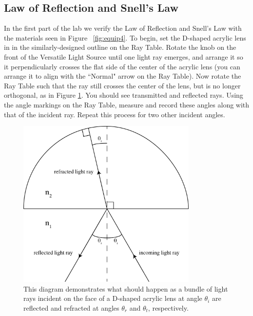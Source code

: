 \subsection{Law of Reflection and Snell's Law}
\label{sec:refsnell}
In the first part of the lab we verify the Law of Reflection and Snell's Law with the materials seen in Figure ~\ref{fig:equip4}.  To begin, set the D-shaped acrylic lens in in the similarly-designed outline on the Ray Table.  Rotate the knob on the front of the Versatile Light Source until one light ray emerges, and arrange it so it perpendicularly crosses the flat side of the center of the acrylic lens (you can arrange it to align with the ``Normal" arrow on the Ray Table).  Now rotate the Ray Table such that the ray still crosses the center of the lens, but is no longer orthogonal, as in Figure \ref{fig:slaw}.  You should see transmitted and reflected rays.  Using the angle markings on the Ray Table, measure and record these angles along with that of the incident ray.  Repeat this process for two other incident angles.\myskip

\begin{figure}[h]
\centering
\includegraphics[width=0.8\textwidth]{./Exp6/pic/snelllawdiagram.png}
\caption{This diagram demonstrates what should happen as a bundle of light rays incident on the face of a D-shaped acrylic lens at angle $\theta_{i}$ are reflected and refracted at angles $\theta_{r}$ and $\theta_{t}$, respectively.}
\label{fig:slaw}
\end{figure}

